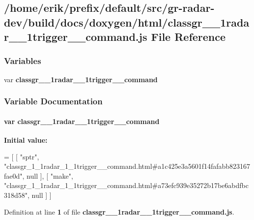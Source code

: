 \subsection{/home/erik/prefix/default/src/gr-\/radar-\/dev/build/docs/doxygen/html/classgr\+\_\+\_\+1radar\+\_\+\_\+1trigger\+\_\+\+\_\+command.js File Reference}
\label{classgr__1__1radar__1__1trigger____command_8js}
\subsubsection*{Variables}
\begin{DoxyCompactItemize}
\item 
var {\bf classgr\+\_\+\_\+1radar\+\_\+\_\+1trigger\+\_\+\+\_\+command}
\end{DoxyCompactItemize}


\subsubsection{Variable Documentation}
\paragraph[{classgr\+\_\+1\+\_\+1radar\+\_\+1\+\_\+1trigger\+\_\+\+\_\+command}]{\setlength{\rightskip}{0pt plus 5cm}var classgr\+\_\+\_\+1radar\+\_\+\_\+1trigger\+\_\+\+\_\+command}\label{classgr__1__1radar__1__1trigger____command_8js_ad74923992d47cbba48fae071c4597518}
{\bfseries Initial value\+:}
\begin{DoxyCode}
=
[
    [ \textcolor{stringliteral}{"sptr"}, \textcolor{stringliteral}{"classgr\_1\_1radar\_1\_1trigger\_\_command.html#a1c425e3a5601f14fafabb823167fae0d"}, null ],
    [ \textcolor{stringliteral}{"make"}, \textcolor{stringliteral}{"classgr\_1\_1radar\_1\_1trigger\_\_command.html#a73efc939e35272b17be6abdfbc318d58"}, null ]
]
\end{DoxyCode}


Definition at line {\bf 1} of file {\bf classgr\+\_\+\_\+1radar\+\_\+\_\+1trigger\+\_\+\+\_\+command.\+js}.

